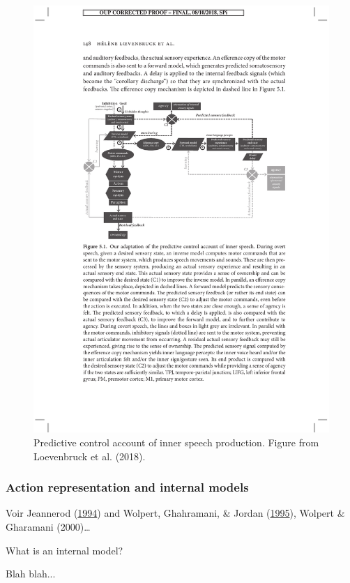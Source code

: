 \documentclass[a4paper,12pt,twoside,openright,oldfontcommands]{memoir}
\begin{document}
\begin{figure}

{\centering \includegraphics[width=0.75\linewidth]{assets/loevenbruck} 

}

\caption{Predictive control account of inner speech production. Figure from Loevenbruck et al. (2018).}\label{fig:loevenbruck}
\end{figure}

\hypertarget{action-representation-and-internal-models}{%
\subsubsection{Action representation and internal models}\label{action-representation-and-internal-models}}

Voir Jeannerod (\protect\hyperlink{ref-jeannerod_representing_1994}{1994}) and Wolpert, Ghahramani, \& Jordan (\protect\hyperlink{ref-wolpert_internal_1995}{1995}), Wolpert \& Gharamani (2000)\ldots{}

\vspace{2mm}

\begin{mybox}[label = model]{What is an internal model?}

Blah blah...

\end{mybox}
\end{document}
